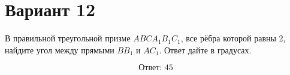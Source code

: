 \documentclass[12pt,a4paper]{article}
\begin{document}
\section*{Вариант 12}

В правильной треугольной призме \(ABCA_1B_1C_1\), все рёбра которой равны 2, найдите угол между прямыми \(BB_1\) и \(AC_1\). Ответ дайте в градусах.

\begin{center}
\end{center}

\[
\boxed{\text{Ответ: }45}
\]
\end{document}
